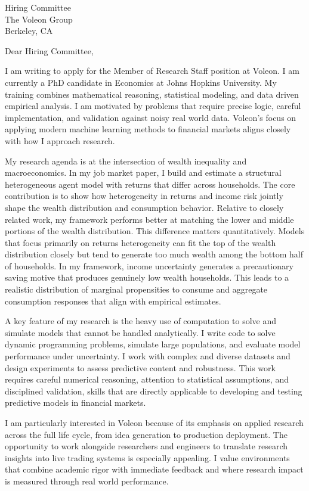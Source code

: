 \documentclass[11pt]{letter}
\begin{document}
\begin{letter}{Hiring Committee \\ The Voleon Group \\ Berkeley, CA}

\opening{Dear Hiring Committee,}

I am writing to apply for the Member of Research Staff position at Voleon. I am currently a PhD candidate in Economics at Johns Hopkins University. My training combines mathematical reasoning, statistical modeling, and data driven empirical analysis. I am motivated by problems that require precise logic, careful implementation, and validation against noisy real world data. Voleon’s focus on applying modern machine learning methods to financial markets aligns closely with how I approach research.

My research agenda is at the intersection of wealth inequality and macroeconomics. In my job market paper, I build and estimate a structural heterogeneous agent model with returns that differ across households. The core contribution is to show how heterogeneity in returns and income risk jointly shape the wealth distribution and consumption behavior. Relative to closely related work, my framework performs better at matching the lower and middle portions of the wealth distribution. This difference matters quantitatively. Models that focus primarily on returns heterogeneity can fit the top of the wealth distribution closely but tend to generate too much wealth among the bottom half of households. In my framework, income uncertainty generates a precautionary saving motive that produces genuinely low wealth households. This leads to a realistic distribution of marginal propensities to consume and aggregate consumption responses that align with empirical estimates.

A key feature of my research is the heavy use of computation to solve and simulate models that cannot be handled analytically. I write code to solve dynamic programming problems, simulate large populations, and evaluate model performance under uncertainty. I work with complex and diverse datasets and design experiments to assess predictive content and robustness. This work requires careful numerical reasoning, attention to statistical assumptions, and disciplined validation, skills that are directly applicable to developing and testing predictive models in financial markets.

I am particularly interested in Voleon because of its emphasis on applied research across the full life cycle, from idea generation to production deployment. The opportunity to work alongside researchers and engineers to translate research insights into live trading systems is especially appealing. I value environments that combine academic rigor with immediate feedback and where research impact is measured through real world performance.


\end{letter}
\end{document}
